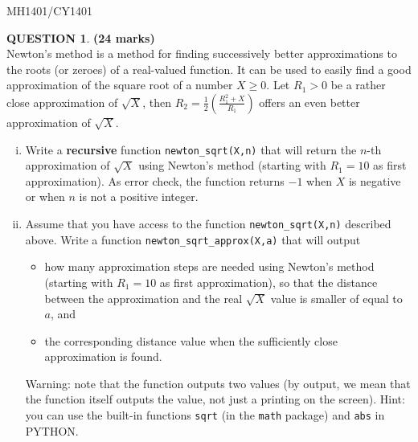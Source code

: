 \documentclass[a4paper,12pt]{article}
\theoremstyle{definition}
\newtheorem{ques}[dummy]{QUESTION}
\theoremstyle{plain}
\newcommand{\ttx}[1]{\texttt{#1}}
\newcommand{\bigbracket}[1]{\left( #1 \right)}
\begin{document}
\newpage

\hfill MH1401/CY1401\vspace*{0.5em}

\begin{ques}\hfill \textbf{(24 marks)}\vspace*{2em}\\
	Newton's method is a method for finding successively better approximations to the roots (or zeroes) of a real-valued function. It can be used to easily find a good approximation of the square root of a number $X\geq 0$. Let $R_1 > 0$ be a rather close approximation of $\sqrt{X}$, then $R_2 = \frac{1}{2}\bigbracket{\frac{R_1^2+X}{R_1}}$ offers an even better approximation of $\sqrt{X}$.
	
	\begin{enumerate}[(i)]
		\item Write a \textbf{recursive} function \ttx{newton\_sqrt(X,n)} that will return the $n$-th approximation of $\sqrt{X}$ using Newton's method (starting with $R_1 = 10$ as first approximation). As error check, the function returns $-1$ when $X$ is negative or when $n$ is not a positive integer.
		
		\item Assume that you have access to the function \ttx{newton\_sqrt(X,n)} described above. Write a function \ttx{newton\_sqrt\_approx(X,a)} that will output
		\begin{itemize}
			\item how many approximation steps are needed using Newton's method (starting with $R_1 = 10$ as first approximation), so that the distance between the approximation and the real $\sqrt{X}$ value is smaller of equal to $a$, and
			\item the corresponding distance value when the sufficiently close approximation is found.
		\end{itemize}
		Warning: note that the function outputs two values (by output, we mean that the function itself outputs the value, not just a printing on the screen). Hint: you can use the built-in functions \ttx{sqrt} (in the \texttt{math} package) and \ttx{abs} in PYTHON.
	\end{enumerate}
\end{ques}
\end{document}
